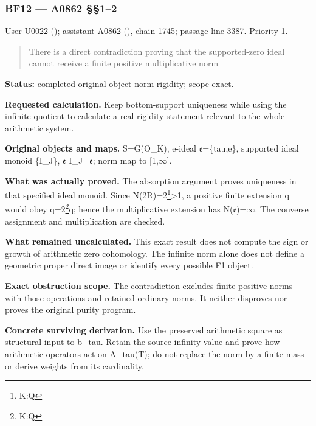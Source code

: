 \documentclass[10pt,a4paper,oneside]{report}
\begin{document}
\subsubsection{BF12 --- A0862 §§1--2}\label{bf12-a0862-12}

User U0022 (\protect{});
assistant A0862 (\protect{}),
chain 1745; passage line 3387. Priority 1.

\begin{quote}
There is a direct contradiction proving that the supported-zero ideal
cannot receive a finite positive multiplicative norm
\end{quote}

\textbf{Status:} completed original-object norm rigidity; scope exact.

\textbf{Requested calculation.} Keep bottom-support uniqueness while
using the infinite quotient to calculate a real rigidity statement
relevant to the whole arithmetic system.

\textbf{Original objects and maps.} S=G(O\_K), e-ideal
\allowbreak{}\ensuremath{𝔢}\allowbreak{}=\{tau,e\}, supported ideal
monoid \{I\_J\}, \allowbreak{}\ensuremath{𝔢}\allowbreak{}
I\_J=\allowbreak{}\ensuremath{𝔢}\allowbreak{}; norm map to
[1,\allowbreak{}\ensuremath{∞}\allowbreak{}].

\textbf{What was actually proved.} The absorption argument proves
uniqueness in that specified ideal monoid. Since
N(2R)=2\footnote{K:Q}\textgreater1, a positive finite extension q would
obey q=2\footnote{K:Q}q; hence the multiplicative extension has
N(\allowbreak{}\ensuremath{𝔢}\allowbreak{})=\allowbreak{}\ensuremath{∞}\allowbreak{}.
The converse assignment and multiplication are checked.

\textbf{What remained uncalculated.} This exact result does not compute
the sign or growth of arithmetic zero cohomology. The infinite norm
alone does not define a geometric proper direct image or identify every
possible F1 object.

\textbf{Exact obstruction scope.} The contradiction excludes finite
positive norms with those operations and retained ordinary norms. It
neither disproves nor proves the original purity program.

\textbf{Concrete surviving derivation.} Use the preserved arithmetic
square as structural input to b\_tau. Retain the source infinity value
and prove how arithmetic operators act on A\_tau(T); do not replace the
norm by a finite mass or derive weights from its cardinality.
\end{document}
